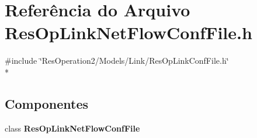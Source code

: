 \section{Referência do Arquivo Res\+Op\+Link\+Net\+Flow\+Conf\+File.\+h}
\label{_res_op_link_net_flow_conf_file_8h}
{\ttfamily \#include \char`\"{}Res\+Operation2/\+Models/\+Link/\+Res\+Op\+Link\+Conf\+File.\+h\char`\"{}}\\*
\subsection*{Componentes}
\begin{DoxyCompactItemize}
\item 
class {\bf Res\+Op\+Link\+Net\+Flow\+Conf\+File}
\end{DoxyCompactItemize}
